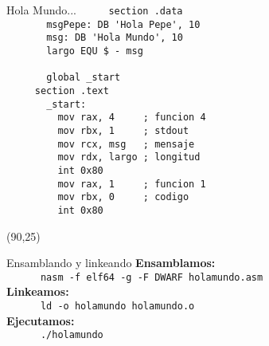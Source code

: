 \documentclass[aspectratio=169]{beamer}
\begin{document}
\begin{frame}[fragile]{Hola Mundo...}
    \verb|     section .data                  |\\ 
    \verb|       msgPepe: DB 'Hola Pepe', 10  | \A \A \B \B \B \B \B \B \B \B \B \T \\
    \verb|       msg: DB 'Hola Mundo', 10     | \A \A \B \B \B \B \B \B \B \B \B \B \T \\
    \verb|       largo EQU $ - msg            |\\
    \verb|                                    |\\
    \verb|       global _start                |\\
    \verb|     section .text                  |\\
    \verb|       _start:                      |\\
    \verb|         mov rax, 4     ; funcion 4 | \A \A  \R \R \B \B \B \B \B \B \B \B \\
    \verb|         mov rbx, 1     ; stdout    | \A \A  \R \R \B \B \B \B \B \B \B \B \\
    \verb|         mov rcx, msg   ; mensaje   | \A \A  \R \R \B \B \B \B \B \B \B \B \\
    \verb|         mov rdx, largo ; longitud  | \A \A  \R \R \B \B \B \B \B \B \B \B \\
    \verb|         int 0x80                   | \A \A  \R \B \\
    \verb|         mov rax, 1     ; funcion 1 | \A \A  \R \R \B \B \B \B \B \B \B \B \\
    \verb|         mov rbx, 0     ; codigo    | \A \A  \R \R \B \B \B \B \B \B \B \B \\
    \verb|         int 0x80                   | \A \A  \R \B \\
    \begin{textblock}{70}(90,25)  \end{textblock}
\end{frame}  

\begin{frame}[fragile]{Ensamblando y linkeando}
    \textbf{Ensamblamos:}\\
    \vspace{0.2cm}
    \verb|      nasm -f elf64 -g -F DWARF holamundo.asm|\\
    \vspace{1cm}
    \textbf{Linkeamos:}\\
    \vspace{0.2cm}
    \verb|      ld -o holamundo holamundo.o|\\
    \vspace{1cm}
    \textbf{Ejecutamos:}\\
    \vspace{0.2cm}
    \verb|      ./holamundo|\\
\end{frame}
\end{document}
